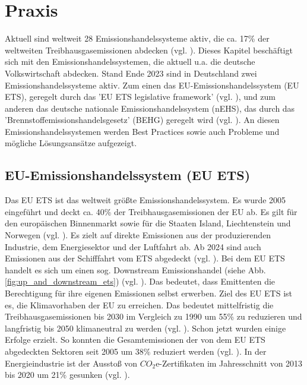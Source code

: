 \chapter{Praxis}

Aktuell sind weltweit 28 Emissionshandelssysteme aktiv, die ca. 17\% der weltweiten Treibhausgasemissionen abdecken (vgl. \cite[S. 7]{icap.2023}).
Dieses Kapitel beschäftigt sich mit den Emissionshandelssystemen, die aktuell u.a. die deutsche Volkswirtschaft abdecken.
Stand Ende 2023 sind in Deutschland zwei Emissionshandelssysteme aktiv.
Zum einen das EU-Emissionshandelssystem (EU ETS), geregelt durch das 'EU ETS legislative framework' (vgl. \cite{eu.2023}), und zum anderen das deutsche nationale Emissionshandelssystem (nEHS), das durch das 'Brennstoffemissionshandelsgesetz' (BEHG) geregelt wird (vgl. \cite{dehst.2023}).
An diesen Emissionshandelssystemen werden Best Practices sowie auch Probleme und mögliche Lösungsansätze aufgezeigt.

\section{EU-Emissionshandelssystem (EU ETS)}

Das EU ETS ist das weltweit größte Emissionshandelssystem. Es wurde 2005 eingeführt und deckt ca. 40\% der Treibhausgasemissionen der EU ab. Es gilt für den europäischen Binnenmarkt sowie für die Staaten Island, Liechtenstein und Norwegen (vgl. \cite[S. 186]{hubert.2020}).
Es zielt auf direkte Emissionen aus der produzierenden Industrie, dem Energiesektor und der Luftfahrt ab. Ab 2024 sind auch Emissionen aus der Schifffahrt vom ETS abgedeckt (vgl. \cite{eu.2023}).
Bei dem EU ETS handelt es sich um einen sog. Downstream Emissionshandel (siehe Abb. \ref{fig:up_and_downstream_ets}) (vgl. \cite{dehst.2023}). 
Das bedeutet, dass Emittenten die Berechtigung für ihre eigenen Emissionen selbst erwerben. Ziel des EU ETS ist es, die Klimavorhaben der EU zu erreichen.
Das bedeutet mittelfristig die Treibhausgasemissionen bis 2030 im Vergleich zu 1990 um 55\% zu reduzieren und langfristig bis 2050 klimaneutral zu werden (vgl. \cite{eu.2023}). Schon jetzt wurden einige Erfolge erzielt. 
So konnten die Gesamtemissionen der von dem EU ETS abgedeckten Sektoren seit 2005 um 38\% reduziert werden (vgl. \cite{dehst3.2023}).
In der Energieindustrie ist der Ausstoß von $CO_2$e-Zertifikaten im Jahresschnitt von 2013 bis 2020 um 21\% gesunken (vgl. \cite{ub3.2023}).

